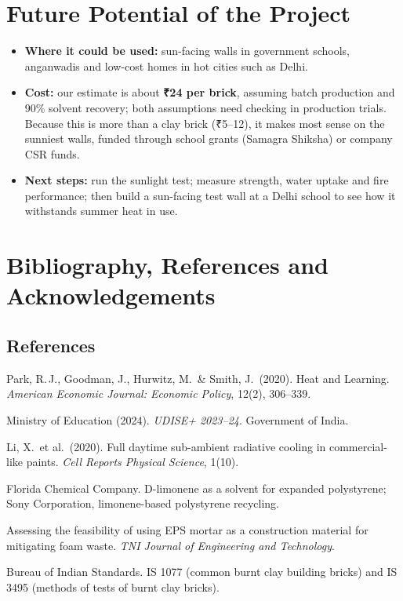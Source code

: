 \documentclass[11pt,a4paper]{article}
\begin{document}
\section{Future Potential of the Project}
\begin{itemize}[leftmargin=*,itemsep=3pt]
  \item \textbf{Where it could be used:} sun-facing walls in government
        schools, anganwadis and low-cost homes in hot cities such as Delhi.
  \item \textbf{Cost:} our estimate is about \textbf{₹24 per brick}, assuming
        batch production and 90\% solvent recovery; both assumptions need
        checking in production trials. Because this is more than a clay brick
        (₹5--12), it makes most sense on the sunniest walls, funded through
        school grants (Samagra Shiksha) or company CSR funds.
  \item \textbf{Next steps:} run the sunlight test; measure strength, water
        uptake and fire performance; then build a sun-facing test wall at a
        Delhi school to see how it withstands summer heat in use.
\end{itemize}

\section{Bibliography, References and Acknowledgements}
\subsection{References}
\small
\begin{enumerate}[label={[\arabic*]},leftmargin=*,itemsep=1pt]
\item Park, R.\,J., Goodman, J., Hurwitz, M.\ \& Smith, J.\ (2020). Heat and Learning. \emph{American Economic Journal: Economic Policy}, 12(2), 306--339.
\item Ministry of Education (2024). \emph{UDISE+ 2023--24}. Government of India.
\item Li, X.\ et al.\ (2020). Full daytime sub-ambient radiative cooling in commercial-like paints. \emph{Cell Reports Physical Science}, 1(10).
\item Florida Chemical Company. D-limonene as a solvent for expanded polystyrene; Sony Corporation, limonene-based polystyrene recycling.
\item Assessing the feasibility of using EPS mortar as a construction material for mitigating foam waste. \emph{TNI Journal of Engineering and Technology}.
\item Bureau of Indian Standards. IS 1077 (common burnt clay building bricks) and IS 3495 (methods of tests of burnt clay bricks).
\end{enumerate}
\normalsize
\end{document}
